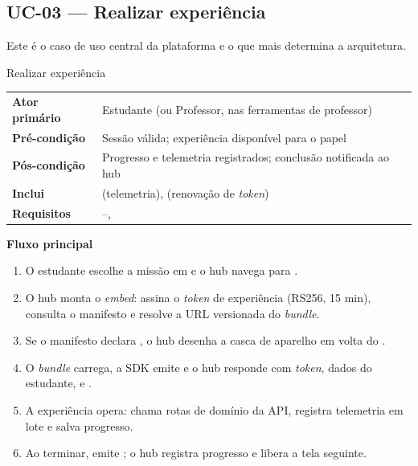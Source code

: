 \subsection{UC-03 --- Realizar experiência}

Este é o caso de uso central da plataforma e o que mais determina a arquitetura.

\begin{especificacao}{ Realizar experiência}
\begin{tabularx}{\linewidth}{@{}L{28mm}X@{}}
\textbf{Ator primário} & Estudante (ou Professor, nas ferramentas de professor)\\
\textbf{Pré-condição} & Sessão válida; experiência disponível para o papel\\
\textbf{Pós-condição} & Progresso e telemetria registrados; conclusão notificada
  ao hub\\
\textbf{Inclui} &  (telemetria),  (renovação de
  \emph{token})\\
\textbf{Requisitos} & --, \\
\end{tabularx}
\end{especificacao}

\textbf{Fluxo principal}
\begin{enumerate}
  \item O estudante escolhe a missão em  e o hub navega para
    .
  \item O hub monta o \emph{embed}: assina o \emph{token} de experiência
    (RS256, 15 min), consulta o manifesto e resolve a URL versionada do
    \emph{bundle}.
  \item Se o manifesto declara , o hub desenha a casca de aparelho
    em volta do .
  \item O \emph{bundle} carrega, a SDK emite  e o hub responde
     com \emph{token}, dados do estudante,  e .
  \item A experiência opera: chama rotas de domínio da API, registra telemetria
    em lote e salva progresso.
  \item Ao terminar, emite ; o hub registra progresso e libera
    a tela seguinte.
\end{enumerate}


